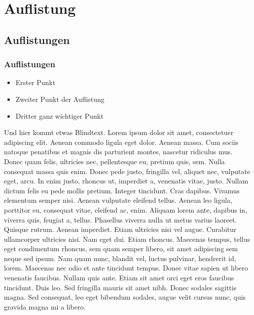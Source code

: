 
\chapter{Auflistung}

\section{Auflistungen}

\subsection{Auflistungen}


\begin{itemize}
	\item Erster Punkt
	\item Zweiter Punkt der Auflistung
	\item Dritter ganz wichtiger Punkt
\end{itemize}

Und hier kommt etwas Blindtext. Lorem ipsum dolor sit amet, consectetuer adipiscing elit. Aenean commodo ligula eget dolor. Aenean massa. Cum sociis natoque penatibus et magnis dis parturient montes, nascetur ridiculus mus. Donec quam felis, ultricies nec, pellentesque eu, pretium quis, sem. Nulla consequat massa quis enim. Donec pede justo, fringilla vel, aliquet nec, vulputate eget, arcu. In enim justo, rhoncus ut, imperdiet a, venenatis vitae, justo. Nullam dictum felis eu pede mollis pretium. Integer tincidunt. Cras dapibus. Vivamus elementum semper nisi. Aenean vulputate eleifend tellus. Aenean leo ligula, porttitor eu, consequat vitae, eleifend ac, enim. Aliquam lorem ante, dapibus in, viverra quis, feugiat a, tellus. Phasellus viverra nulla ut metus varius laoreet. Quisque rutrum. Aenean imperdiet. Etiam ultricies nisi vel augue. Curabitur ullamcorper ultricies nisi. Nam eget dui. Etiam rhoncus. Maecenas tempus, tellus eget condimentum rhoncus, sem quam semper libero, sit amet adipiscing sem neque sed ipsum. Nam quam nunc, blandit vel, luctus pulvinar, hendrerit id, lorem. Maecenas nec odio et ante tincidunt tempus. Donec vitae sapien ut libero venenatis faucibus. Nullam quis ante. Etiam sit amet orci eget eros faucibus tincidunt. Duis leo. Sed fringilla mauris sit amet nibh. Donec sodales sagittis magna. Sed consequat, leo eget bibendum sodales, augue velit cursus nunc, quis gravida magna mi a libero. 

